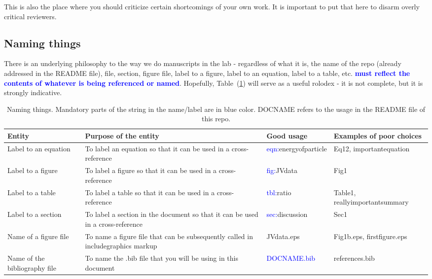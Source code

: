 \documentclass[12 pt]{article}
\begin{document}
This is also the place where you should criticize certain shortcomings of your own work. It is important to put that here to disarm overly critical reviewers.


\subsection{Naming things}

There is an underlying philosophy to the way we do manuscripts in the lab - regardless of what it is, the name of the repo (already addressed in the README file), file, section, figure file, label to a figure, label to an equation, label to a table, etc. \textbf{\Huge \textcolor{blue}{must reflect the contents of whatever is being referenced or named}}. Hopefully, Table~(\ref{tbl:namingthings}) will serve as a useful rolodex - it is not complete, but it is strongly indicative.

\begin{center}
  \begin{longtable}{|p{3cm}|p{5cm}|p{3.5cm}|p{2.5cm}|}
    \caption{Naming things. Mandatory parts of the string in the name/label are in blue color. DOCNAME refers to the usage in the README file of this repo.} \label{tbl:namingthings}\\
    \hline
    \textbf{Entity}  & \textbf{Purpose of the entity} &  \textbf{Good usage} & \textbf{Examples of poor choices} \\\hline
    Label to an equation & To label an equation so that it can be used in a cross-reference & \textcolor{blue}{eqn:}energyofparticle & Eq12, importantequation \\\hline
    Label to a figure & To label a figure so that it can be used in a cross-reference & \textcolor{blue}{fig:}JVdata & Fig1 \\\hline
    Label to a table & To label a table so that it can be used in a cross-reference & \textcolor{blue}{tbl:}ratio & Table1, reallyimportantsummary \\\hline
    Label to a section & To label a section in the document so that it can be used in a cross-reference & \textcolor{blue}{sec:}discussion & Sec1 \\\hline
    Name of a figure file & To name a figure file that can be subsequently called in includegraphics markup & JVdata.eps & Fig1b.eps, firstfigure.eps\\\hline
    Name of the bibliography file & To name the .bib file that you will be using in this document & \textcolor{blue}{DOCNAME.bib} & references.bib \\\hline
  \end{longtable}
\end{center}
\end{document}
